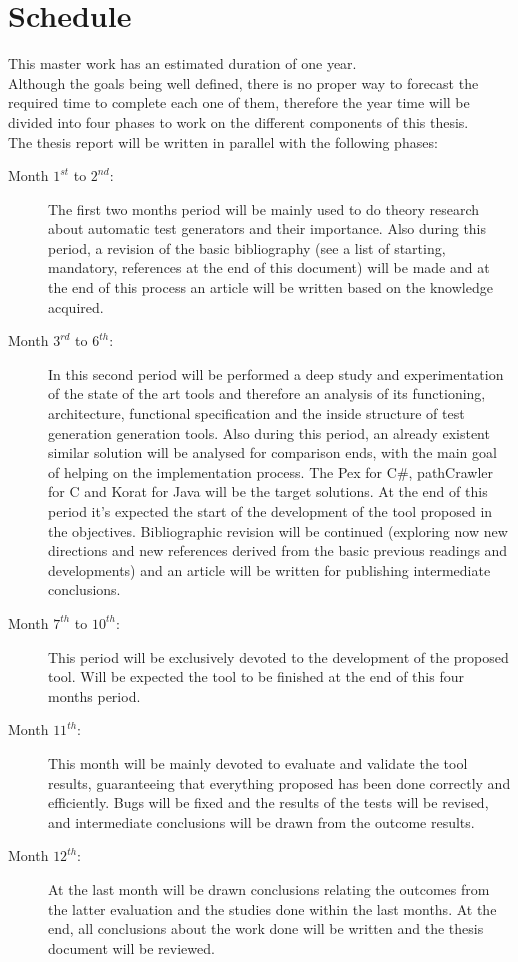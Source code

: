 \documentclass[a4paper,12pt]{article}
\begin{document}
\section{\Large Schedule}
This master work has an estimated duration of one year.\\[6pt]
Although the goals being well defined, there is no proper way to forecast the required time to complete each one of them,
therefore the year time will be divided into four phases to work on the different components of this thesis.\\[6pt]
The thesis report will be written in parallel with the following phases:
\begin{description}
\item[Month $1^{st}$ to $2^{nd}$:] The first two months period will be mainly used to do theory research about
automatic test generators and their importance.
Also during this period, a revision of the basic bibliography (see a list of starting, mandatory, references at the end of this document) will be made
and at the end of this process an article will be written based on the knowledge acquired.
\item[Month $3^{rd}$ to $6^{th}$:] In this second period will be performed a deep study and experimentation
of the state of the art tools and therefore an analysis of its functioning, architecture, functional specification and the inside structure
of test generation generation tools.
Also during this period, an already existent similar solution will be analysed for comparison ends, with the main goal of helping on the implementation process.
The Pex\cite{Tillmann:2008:PWB:1792786.1792798} for C\#, pathCrawler\cite{Williams05pathcrawler:automatic} for C and Korat\cite{Boyapati02korat:automated}
for Java will be the target solutions.
At the end of this period it's expected the start of the development of the tool proposed in the objectives.
Bibliographic revision will be continued (exploring now new directions and new references derived from the basic previous readings and developments)
and an article will be written for publishing intermediate conclusions.
\item[Month $7^{th}$ to $10^{th}$:] This period will be exclusively devoted to the development of the proposed tool.
Will be expected the tool to be finished at the end of this four months period.
\item[Month $11^{th}$:] This month will be mainly devoted to evaluate and validate the tool results, guaranteeing that everything proposed has
been done correctly and efficiently. Bugs will be fixed and the results of the tests will be revised, and intermediate conclusions will be drawn from the outcome results.
\item[Month $12^{th}$:] At the last month will be drawn conclusions relating the outcomes from the latter evaluation and the studies done within
the last months. At the end, all conclusions about the work done will be written and the thesis document will be reviewed.
\end{description}



\end{document}
